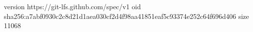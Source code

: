 version https://git-lfs.github.com/spec/v1
oid sha256:a7abf0930c2c8d21d1aea030cf2d4f98aa41851eaf5c93374e252c64f696d406
size 11068
